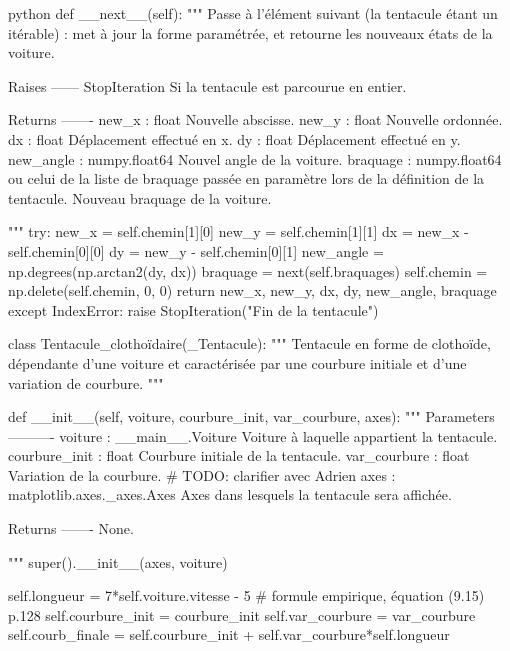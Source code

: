 \begin{mintedbox}{python}
    def __next__(self):
        """
        Passe à l'élément suivant (la tentacule étant un itérable) : met à jour la forme paramétrée, et retourne les nouveaux états de la voiture.

        Raises
        ------
        StopIteration
            Si la tentacule est parcourue en entier.

        Returns
        -------
        new_x : float
            Nouvelle abscisse.
        new_y : float
            Nouvelle ordonnée.
        dx : float
            Déplacement effectué en x.
        dy : float
            Déplacement effectué en y.
        new_angle : numpy.float64
            Nouvel angle de la voiture.
        braquage : numpy.float64 ou celui de la liste de braquage passée en paramètre lors de la définition de la tentacule.
            Nouveau braquage de la voiture.

        """
        try:
            new_x = self.chemin[1][0]
            new_y = self.chemin[1][1]
            dx = new_x - self.chemin[0][0]
            dy = new_y - self.chemin[0][1]
            new_angle = np.degrees(np.arctan2(dy, dx))
            braquage = next(self.braquages)
            self.chemin = np.delete(self.chemin, 0, 0)
            return new_x, new_y, dx, dy, new_angle, braquage
        except IndexError:
            raise StopIteration("Fin de la tentacule")


class Tentacule_clothoïdaire(_Tentacule):
    """
    Tentacule en forme de clothoïde, dépendante d'une voiture et caractérisée par une courbure initiale et d'une variation de courbure.
    """

    def __init__(self, voiture, courbure_init, var_courbure, axes):
        """
        Parameters
        ----------
        voiture : __main__.Voiture
            Voiture à laquelle appartient la tentacule.
        courbure_init : float
            Courbure initiale de la tentacule.
        var_courbure : float
            Variation de la courbure.  # TODO: clarifier avec Adrien
        axes : matplotlib.axes._axes.Axes
            Axes dans lesquels la tentacule sera affichée.

        Returns
        -------
        None.

        """
        super().__init__(axes, voiture)

        self.longueur = 7*self.voiture.vitesse - 5  # formule empirique, équation (9.15) p.128
        self.courbure_init = courbure_init
        self.var_courbure = var_courbure
        self.courb_finale = self.courbure_init + self.var_courbure*self.longueur


\end{mintedbox}
